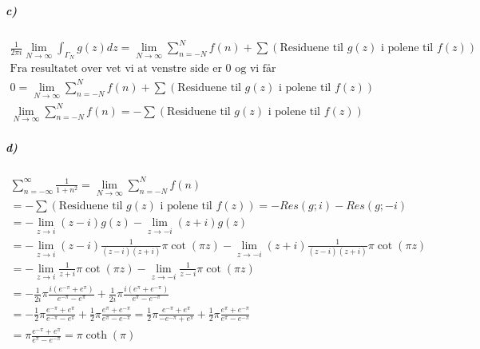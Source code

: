 \documentclass[11pt, A4paper,norsk]{article}
\begin{document}
			\subparagraph{c)}
				\begin{gather*}
\frac{1}{2 \pi i} \lim_{N \rightarrow \infty} \int_{\Gamma_N} g(z) dz  = \lim_{N \rightarrow \infty} \sum_{n = - N}^{N} f(n) + \sum( \text{Residuene til $g(z)$ i polene til $f(z)$} ) \\
\text{Fra resultatet over vet vi at venstre side er $0$ og vi får} \\
0 = \lim_{N \rightarrow \infty} \sum_{n = - N}^{N} f(n) + \sum( \text{Residuene til $g(z)$ i polene til $f(z)$} ) \\
\lim_{N \rightarrow \infty} \sum_{n = - N}^{N} f(n) = - \sum( \text{Residuene til $g(z)$ i polene til $f(z)$} )
				\end{gather*}









			\subparagraph{d)}
				\begin{gather*}
\sum_{n = - \infty}^{\infty} \frac{1}{1 + n^2} = \lim_{N \rightarrow \infty} \sum_{n = - N}^{N} f(n) \\
= - \sum ( \text{Residuene til $g(z)$ i polene til $f(z)$} ) = - Res(g; i) - Res(g; - i) \\
= - \lim_{z \rightarrow i} (z - i) g(z) - \lim_{z \rightarrow - i} (z + i) g(z) \\
= - \lim_{z \rightarrow i} (z - i) \frac{1}{(z - i)(z + i)} \pi \cot(\pi z) - \lim_{z \rightarrow - i} (z + i) \frac{1}{(z - i)(z + i)} \pi \cot(\pi z) \\
= - \lim_{z \rightarrow i} \frac{1}{z + i} \pi \cot(\pi z) - \lim_{z \rightarrow - i} \frac{1}{z - i} \pi \cot(\pi z) \\
= - \frac{1}{2i} \pi \frac{i(e^{- \pi} + e^{\pi})}{e^{- \pi} - e^{\pi}} + \frac{1}{2i} \pi \frac{i(e^{\pi} + e^{-\pi})}{e^{\pi} - e^{- \pi}} \\
= - \frac{1}{2} \pi \frac{e^{- \pi} + e^{\pi}}{e^{- \pi} - e^{\pi}} + \frac{1}{2} \pi \frac{e^{\pi} + e^{-\pi}}{e^{\pi} - e^{- \pi}} = \frac{1}{2} \pi \frac{e^{- \pi} + e^{\pi}}{- e^{- \pi} + e^{\pi}} + \frac{1}{2} \pi \frac{e^{\pi} + e^{-\pi}}{e^{\pi} - e^{- \pi}} \\
= \pi \frac{e^{- \pi} + e^{\pi}}{e^{\pi} - e^{- \pi}} = \pi \coth(\pi)
				\end{gather*}
\end{document}
